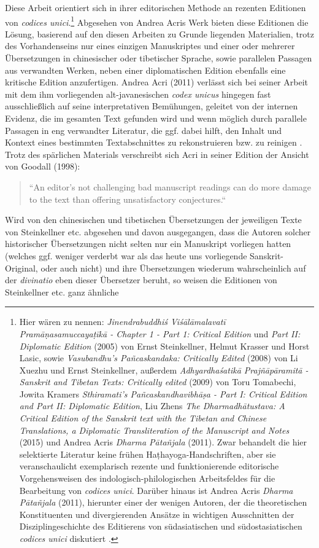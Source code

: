 \documentclass[a4paper,12pt]{article}
\begin{document}
{Diese Arbeit orientiert sich in ihrer editorischen Methode an rezenten Editionen von \textit{codices unici}.\footnote{Hier wären zu nennen: \textit{Jinendrabuddhiś Viśālāmalavatī Pramāṇasamuccayaṭīkā - Chapter 1 - Part 1: Critical Edition} und \textit{Part II: Diplomatic Edition} (2005) von Ernst Steinkellner, Helmut Krasser und Horst Lasic, sowie \textit{Vasubandhu's Pañcaskandaka: Critically Edited} (2008) von Li Xuezhu und Ernst Steinkellner, außerdem \textit{Adhyardhaśatikā Prajñāpāramitā - Sanskrit and Tibetan Texts: Critically edited} (2009) von Toru Tomabechi, Jowita Kramers \textit{Sthiramati's Pañcaskandhavibhāṣa - Part I: Critical Edition and Part II: Diplomatic Edition}, Liu Zhens \textit{The Dharmadhātustava: A Critical Edition of the Sanskrit text with the Tibetan and Chinese Translations, a Diplomatic Transliteration of the Manuscript and Notes} (2015) und Andrea Acris \textit{Dharma Pātañjala} (2011). Zwar behandelt die hier selektierte Literatur keine frühen Haṭhayoga-Handschriften, aber sie veranschaulicht exemplarisch rezente und funktionierende editorische Vorgehensweisen des indologisch-philologischen Arbeitsfeldes für die Bearbeitung von \textit{codices unici}. Darüber hinaus ist Andrea Acris \textit{Dharma Pātañjala} (2011), hierunter einer der wenigen Autoren, der die theoretischen Konstituenten und divergierenden Ansätze in wichtigen Ausschnitten der Disziplingeschichte des Editierens von südasiatischen und südostasiatischen \textit{codices unici} diskutiert \parencite[81-98]{acri2011dharma}.} Abgesehen von Andrea Acris Werk bieten diese Editionen die Lösung, basierend auf den diesen Arbeiten zu Grunde liegenden Materialien, trotz des Vorhandenseins nur eines einzigen Manuskriptes und einer oder mehrerer Übersetzungen in chinesischer oder tibetischer Sprache, sowie parallelen Passagen aus verwandten Werken, neben einer diplomatischen Edition ebenfalls eine kritische Edition anzufertigen. Andrea Acri (2011) verlässt sich bei seiner Arbeit mit dem ihm vorliegenden alt-javanesischen \textit{codex unicus} hingegen fast ausschließlich auf seine interpretativen Bemühungen, geleitet von der internen Evidenz, die im gesamten Text gefunden wird und wenn möglich durch parallele Passagen in eng verwandter Literatur, die ggf. dabei hilft, den Inhalt und Kontext eines bestimmten Textabschnittes zu rekonstruieren bzw. zu reinigen \parencite[89]{acri2011dharma}. Trotz des spärlichen Materials verschreibt sich Acri in seiner Edition der Ansicht von Goodall (1998): \begin{quote} ``An editor's not challenging bad manuscript readings can do more damage to the text than offering unsatisfactory conjectures.`` \parencite[cxiv]{goodall1998}\end{quote} Wird von den chinesischen und tibetischen Übersetzungen der jeweiligen Texte von Steinkellner etc. abgesehen und davon ausgegangen, dass die Autoren solcher historischer Übersetzungen nicht selten nur ein Manuskript vorliegen hatten (welches ggf. weniger verderbt war als das heute uns vorliegende Sanskrit-Original, oder auch nicht) und ihre Übersetzungen wiederum wahrscheinlich auf der \textit{divinatio} eben dieser Übersetzer beruht, so weisen die Editionen von Steinkellner etc. ganz ähnliche }
\end{document}
